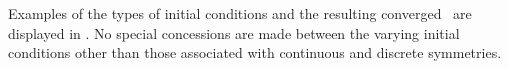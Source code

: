 


Examples of the types of initial conditions and the resulting converged \twots\
are displayed in . No special concessions
are made between the varying initial conditions other than those associated
with continuous and discrete symmetries.


